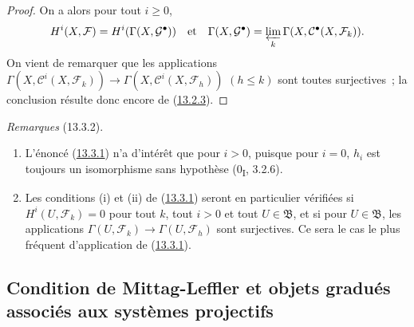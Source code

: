 \begin{proof}
On a alors pour tout $i\geq0$,
\[
H^i(X,\mathcal F)=H^i(\Gamma(X,\mathcal G^\bullet))
\quad\hbox{et}\quad
\Gamma(X,\mathcal G^\bullet)
=\varprojlim_k\Gamma(X,\mathcal C^\bullet(X,\mathcal F_k)).
\]
On vient de remarquer que les applications
$\Gamma(X,\mathcal C^i(X,\mathcal F_k))\to
\Gamma(X,\mathcal C^i(X,\mathcal F_h))$ $(h\leq k)$ sont toutes
surjectives~; la conclusion résulte donc encore de
(\hyperref[0.13.2.3-fr]{13.2.3}).
\end{proof}

\begin{env}[13.3.2]
\label{0.13.3.2-fr}
\emph{Remarques} (13.3.2).
\begin{enumerate}
\item[\emph{(i)}]
L'énoncé (\hyperref[0.13.3.1-fr]{13.3.1}) n'a d'intérêt que pour $i>0$,
puisque pour $i=0$, $h_i$ est toujours un isomorphisme sans hypothèse
(0\textsubscript{I}, 3.2.6).
\item[\emph{(ii)}]
Les conditions (i) et (ii) de (\hyperref[0.13.3.1-fr]{13.3.1}) seront en
particulier vérifiées si $H^i(U,\mathcal F_k)=0$ pour tout $k$, tout $i>0$
et tout $U\in\mathfrak B$, et si pour $U\in\mathfrak B$, les applications
$\Gamma(U,\mathcal F_k)\to\Gamma(U,\mathcal F_h)$ sont surjectives. Ce sera
le cas le plus fréquent d'application de
(\hyperref[0.13.3.1-fr]{13.3.1}).
\end{enumerate}
\end{env}

\subsection{Condition de Mittag-Leffler et objets gradués associés aux systèmes projectifs}
\label{subsection:0.13.4-fr}
\label{0.13.4-fr}

